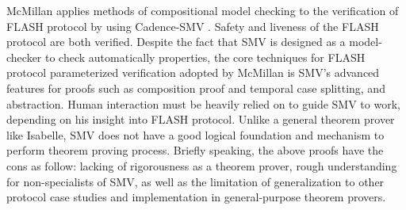 \documentclass{llncs}
\newcommand{\forget}[1]{}
\begin{document}
McMillan applies methods of compositional model
checking \cite{McMillan2001} to the verification of FLASH protocol by using Cadence-SMV \cite{cadenceSMV}. %
Safety and liveness of the
FLASH protocol are both verified. Despite the fact that SMV is designed as a model-checker to  check automatically properties, the core techniques for FLASH protocol parameterized verification adopted by McMillan is SMV's advanced features for proofs such as composition proof and temporal case splitting, and abstraction. Human interaction must be heavily relied on to  guide SMV to work, depending on his insight into FLASH protocol. Unlike a general theorem prover like Isabelle, SMV does not have a good logical foundation and mechanism to perform theorem proving process. Briefly speaking, the above proofs have the cons as follow: lacking of rigorousness as a theorem prover, rough understanding for non-specialists of SMV, as well as the limitation of generalization to other protocol case studies and implementation in general-purpose theorem provers. \forget{The above proofs are neither rigorous as a theorem prover, nor easily understood to a non-specialist of SMV.  Because these proof techniques are  only special for SMV,  they are  difficult to be generalized to other protocols and to be implemented in a general-purpose theorem prover.}
\end{document}
